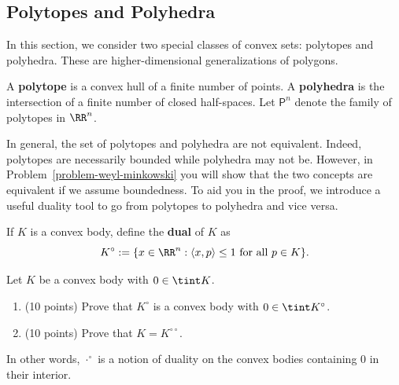 \documentclass[11pt]{article}
\begin{document}
\subsection{Polytopes and Polyhedra}

In this section, we consider two special classes of convex sets: polytopes and polyhedra. These are higher-dimensional generalizations of polygons. 

\begin{defn}
    A \textbf{polytope} is a convex hull of a finite number of points. A \textbf{polyhedra} is the intersection of a finite number of closed half-spaces. Let $\mathsf{P}^n$ denote the family of polytopes in $\RR^n$.
\end{defn}

In general, the set of polytopes and polyhedra are not equivalent. Indeed, polytopes are necessarily bounded while polyhedra may not be. However, in Problem~\ref{problem-weyl-minkowski} you will show that the two concepts are equivalent if we assume boundedness. To aid you in the proof, we introduce a useful duality tool to go from polytopes to polyhedra and vice versa.  

\begin{defn}
    If $K$ is a convex body, define the \textbf{dual} of $K$ as
    \[
        K^\circ := \{ x \in \RR^n : \langle x, p \rangle \leq 1 \text{ for all } p \in K\}.
    \]
\end{defn}
\begin{prob}[20 points]
    Let $K$ be a convex body with $0 \in \tint K$. 
    \begin{enumerate}[label = (\alph*)]
        \item (10 points) Prove that $K^\circ$ is a convex body with $0 \in \tint K^\circ$. 
        \item (10 points) Prove that $K = K^{\circ \circ}$. 
    \end{enumerate}
    In other words, $\cdot^{\circ}$ is a notion of duality on the convex bodies containing $0$ in their interior. 
\end{prob}
\end{document}
